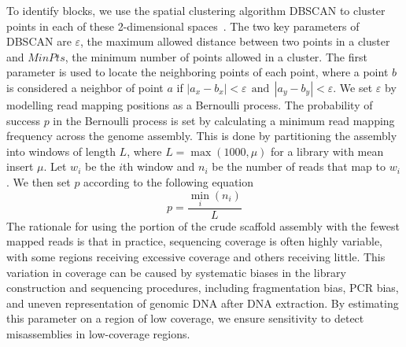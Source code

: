 \documentclass{bioinfo}
\begin{document}
To identify blocks, we use the spatial clustering algorithm DBSCAN 
to cluster points in each of these 2-dimensional spaces~\citep{DBSCAN}. The two key parameters of DBSCAN are $\varepsilon$, the maximum allowed
distance between two points in a cluster and $MinPts$, the minimum number of points allowed in a cluster. The first parameter is used to locate 
the neighboring points of each point, where a point $b$ is considered a neighbor of point $a$ if $|a_x - b_x| < \varepsilon 
~~\mbox{and}~~ |a_y - b_y| < \varepsilon$. We set $\varepsilon$ by modelling read mapping positions as a Bernoulli process. 
The probability of success $p$ in the Bernoulli process is set by calculating a minimum read mapping frequency across the genome assembly.
This is done by partitioning the assembly into windows of length $L$, where $L = \max(1000,\mu)$ for a library with mean insert $\mu$. 
Let $w_i$ be the $i$th window and $n_i$ be the number of reads that map to $w_i$. We then set $p$ according to the following equation
\begin{equation}
	p = \dfrac{\min_{i}(n_i)}{L}
\end{equation}
The rationale for using the portion of the crude scaffold assembly with the fewest mapped reads is that in practice, sequencing
coverage is often highly variable, with some regions receiving excessive coverage and others receiving little. This variation
in coverage can be caused by systematic biases in the library construction and sequencing procedures, including fragmentation bias,
PCR bias, and uneven representation of genomic DNA after DNA extraction. By estimating this parameter on a region of low
coverage, we ensure sensitivity to detect misassemblies in low-coverage regions.
\end{document}
